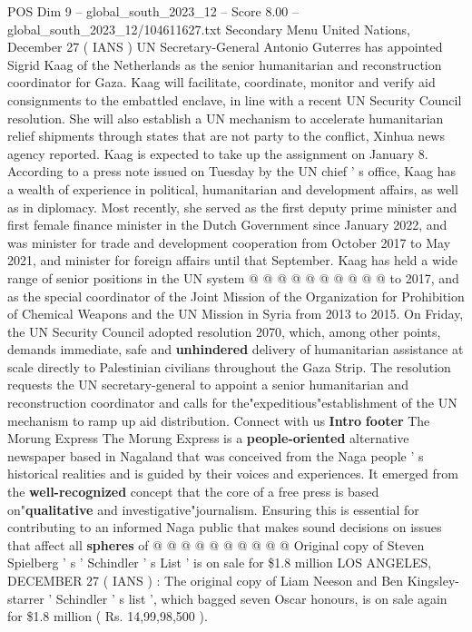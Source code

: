 \begin{textsample}{POS Dim 9 – global\_south\_2023\_12 – Score 8.00 – global\_south\_2023\_12/104611627.txt}  \label{ex:f9_pos_002}
Secondary Menu United Nations, December 27 ( IANS ) UN Secretary-General Antonio Guterres has appointed Sigrid Kaag of the Netherlands as the senior humanitarian and reconstruction coordinator for Gaza.
Kaag will facilitate, coordinate, monitor and verify aid consignments to the embattled enclave, in line with a recent UN Security Council resolution.
She will also establish a UN mechanism to accelerate humanitarian relief shipments through states that are not party to the conflict, Xinhua news agency reported.
Kaag is expected to take up the assignment on January 8.
According to a press note issued on Tuesday by the UN chief ' s office, Kaag has a wealth of experience in political, humanitarian and development affairs, as well as in diplomacy.
Most recently, she served as the first deputy prime minister and first female finance minister in the Dutch Government since January 2022, and was minister for trade and development cooperation from October 2017 to May 2021, and minister for foreign affairs until that September.
Kaag has held a wide range of senior positions in the UN system @ @ @ @ @ @ @ @ @ @ to 2017, and as the special coordinator of the Joint Mission of the Organization for Prohibition of Chemical Weapons and the UN Mission in Syria from 2013 to 2015.
On Friday, the UN Security Council adopted resolution 2070, which, among other points, demands immediate, safe and \textbf{unhindered} delivery of humanitarian assistance at scale directly to Palestinian civilians throughout the Gaza Strip.
The resolution requests the UN secretary-general to appoint a senior humanitarian and reconstruction coordinator and calls for the"expeditious"establishment of the UN mechanism to ramp up aid distribution.
Connect with us \textbf{Intro} \textbf{footer} The Morung Express The Morung Express is a \textbf{people-oriented} alternative newspaper based in Nagaland that was conceived from the Naga people ' s historical realities and is guided by their voices and experiences.
It emerged from the \textbf{well-recognized} concept that the core of a free press is based on"\textbf{qualitative} and investigative"journalism.
Ensuring this is essential for contributing to an informed Naga public that makes sound decisions on issues that affect all \textbf{spheres} of @ @ @ @ @ @ @ @ @ @ Original copy of Steven Spielberg ' s ' Schindler ' s List ' is on sale for \$1.8 million LOS ANGELES, DECEMBER 27 ( IANS ) : The original copy of Liam Neeson and Ben Kingsley-starrer ' Schindler ' s list ', which bagged seven Oscar honours, is on sale again for \$1.8 million ( Rs. 14,99,98,500 ).

\end{textsample}
